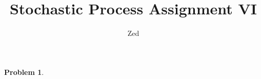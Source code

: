 \documentclass[a4paper, 10pt]{article}
\title{\textbf{Stochastic Process Assignment VI}}
\author{Zed}
\theoremstyle{definition}
\newtheorem{problem}{Problem}
\theoremstyle{hSol}
\begin{document}
\maketitle

\begin{problem} 
\end{problem}
\end{document}
